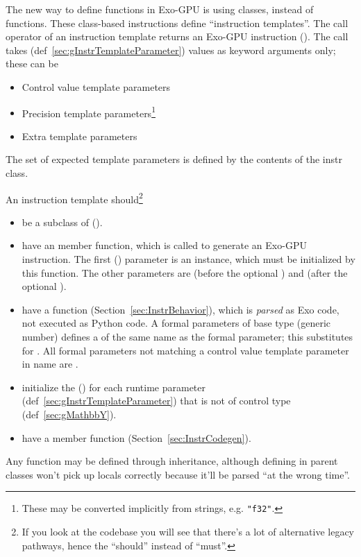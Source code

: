 
The new way to define functions in Exo-GPU is using classes, instead of functions.
These class-based instructions define ``instruction templates''.
The call operator of an instruction template returns an Exo-GPU instruction ().
The call takes  (def~\ref{sec:gInstrTemplateParameter}) values as keyword arguments only; these can be
\begin{itemize}
  \item Control value template parameters
  \item Precision template parameters\footnote{These may be converted implicitly from strings, e.g. \texttt{"f32"}.}
  \item Extra template parameters
\end{itemize}
The set of expected template parameters is defined by the contents of the instr class.

An instruction template should\footnote{If you look at the codebase you will see that there's a lot of alternative legacy pathways, hence the ``should'' instead of ``must''.}
\begin{itemize}
   \item be a subclass of  ().
   \item have an  member function, which is called to generate an Exo-GPU instruction.
     The first () parameter is an  instance, which must be initialized by this function.
     The other parameters are  (before the optional \lighttt{*}) and  (after the optional \lighttt{*}).
   \item have a  function (Section~\ref{sec:InstrBehavior}), which is \emph{parsed} as Exo code, not executed as Python code.
     A formal parameters of base type  (generic number) defines a  of the same name as the formal parameter; this substitutes for .
     All formal parameters not matching a control value template parameter in name are .
   \item initialize the  () for each runtime parameter (def~\ref{sec:gInstrTemplateParameter}) that is not of control type (def~\ref{sec:gMathbbY}).
   \item have a  member function (Section~\ref{sec:InstrCodegen}).
\end{itemize}
Any function may be defined through inheritance, although defining  in parent classes won't pick up locals correctly because it'll be parsed ``at the wrong time''.

